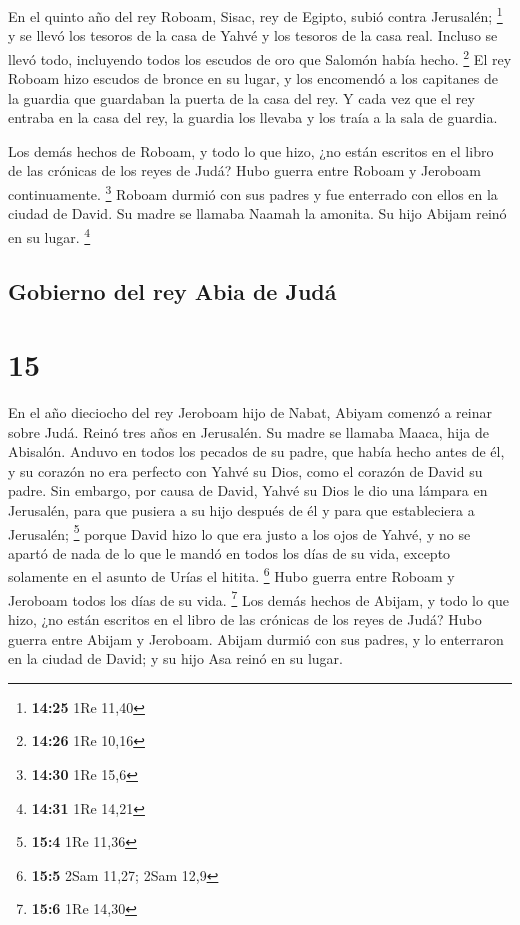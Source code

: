  En el quinto año del rey Roboam, Sisac, rey de Egipto,
subió contra Jerusalén; \footnote{\textbf{14:25} 1Re 11,40}
 y se llevó los tesoros de la casa de Yahvé y los tesoros
de la casa real. Incluso se llevó todo, incluyendo todos los escudos de
oro que Salomón había hecho. \footnote{\textbf{14:26} 1Re 10,16}
 El rey Roboam hizo escudos de bronce en su lugar, y los
encomendó a los capitanes de la guardia que guardaban la puerta de la
casa del rey.  Y cada vez que el rey entraba en la casa
del rey, la guardia los llevaba y los traía a la sala de guardia.

 Los demás hechos de Roboam, y todo lo que hizo, ¿no
están escritos en el libro de las crónicas de los reyes de Judá?
 Hubo guerra entre Roboam y Jeroboam continuamente.
\footnote{\textbf{14:30} 1Re 15,6}  Roboam durmió con sus
padres y fue enterrado con ellos en la ciudad de David. Su madre se
llamaba Naamah la amonita. Su hijo Abijam reinó en su lugar. \footnote{\textbf{14:31}
  1Re 14,21}

\hypertarget{gobierno-del-rey-abia-de-juduxe1}{%
\subsection{Gobierno del rey Abia de
Judá}\label{gobierno-del-rey-abia-de-juduxe1}}

\hypertarget{section-14}{%
\section{15}\label{section-14}}

 En el año dieciocho del rey Jeroboam hijo de Nabat,
Abiyam comenzó a reinar sobre Judá.  Reinó tres años en
Jerusalén. Su madre se llamaba Maaca, hija de Abisalón. 
Anduvo en todos los pecados de su padre, que había hecho antes de él, y
su corazón no era perfecto con Yahvé su Dios, como el corazón de David
su padre.  Sin embargo, por causa de David, Yahvé su Dios
le dio una lámpara en Jerusalén, para que pusiera a su hijo después de
él y para que estableciera a Jerusalén; \footnote{\textbf{15:4} 1Re
  11,36}  porque David hizo lo que era justo a los ojos de
Yahvé, y no se apartó de nada de lo que le mandó en todos los días de su
vida, excepto solamente en el asunto de Urías el hitita. \footnote{\textbf{15:5}
  2Sam 11,27; 2Sam 12,9}  Hubo guerra entre Roboam y
Jeroboam todos los días de su vida. \footnote{\textbf{15:6} 1Re 14,30}
 Los demás hechos de Abijam, y todo lo que hizo, ¿no están
escritos en el libro de las crónicas de los reyes de Judá? Hubo guerra
entre Abijam y Jeroboam.  Abijam durmió con sus padres, y
lo enterraron en la ciudad de David; y su hijo Asa reinó en su lugar.

